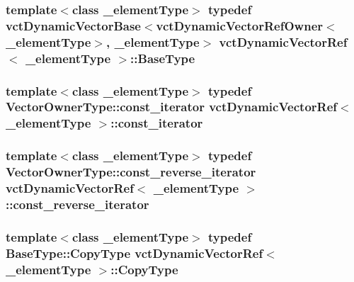 \subsubsection[{Base\+Type}]{\setlength{\rightskip}{0pt plus 5cm}template$<$class \+\_\+element\+Type$>$ typedef {\bf vct\+Dynamic\+Vector\+Base}$<${\bf vct\+Dynamic\+Vector\+Ref\+Owner}$<$\+\_\+element\+Type$>$, \+\_\+element\+Type$>$ {\bf vct\+Dynamic\+Vector\+Ref}$<$ \+\_\+element\+Type $>$\+::{\bf Base\+Type}}\label{classvct_dynamic_vector_ref_acebe42b08620767155f3b769ce292163}
\hypertarget{classvct_dynamic_vector_ref_a1ee3349f080cad407612465754d45c38}{}
\subsubsection[{const\+\_\+iterator}]{\setlength{\rightskip}{0pt plus 5cm}template$<$class \+\_\+element\+Type$>$ typedef {\bf Vector\+Owner\+Type\+::const\+\_\+iterator} {\bf vct\+Dynamic\+Vector\+Ref}$<$ \+\_\+element\+Type $>$\+::{\bf const\+\_\+iterator}}\label{classvct_dynamic_vector_ref_a1ee3349f080cad407612465754d45c38}
\hypertarget{classvct_dynamic_vector_ref_a9600a1990f185ffa4e5a58793a56e8af}{}
\subsubsection[{const\+\_\+reverse\+\_\+iterator}]{\setlength{\rightskip}{0pt plus 5cm}template$<$class \+\_\+element\+Type$>$ typedef {\bf Vector\+Owner\+Type\+::const\+\_\+reverse\+\_\+iterator} {\bf vct\+Dynamic\+Vector\+Ref}$<$ \+\_\+element\+Type $>$\+::{\bf const\+\_\+reverse\+\_\+iterator}}\label{classvct_dynamic_vector_ref_a9600a1990f185ffa4e5a58793a56e8af}
\hypertarget{classvct_dynamic_vector_ref_a3d9425849772cea79d6ba9136ae2e3fd}{}
\subsubsection[{Copy\+Type}]{\setlength{\rightskip}{0pt plus 5cm}template$<$class \+\_\+element\+Type$>$ typedef {\bf Base\+Type\+::\+Copy\+Type} {\bf vct\+Dynamic\+Vector\+Ref}$<$ \+\_\+element\+Type $>$\+::{\bf Copy\+Type}}\label{classvct_dynamic_vector_ref_a3d9425849772cea79d6ba9136ae2e3fd}
\hypertarget{classvct_dynamic_vector_ref_a60db16bd51d6129d93e63c1df05c544e}{}
